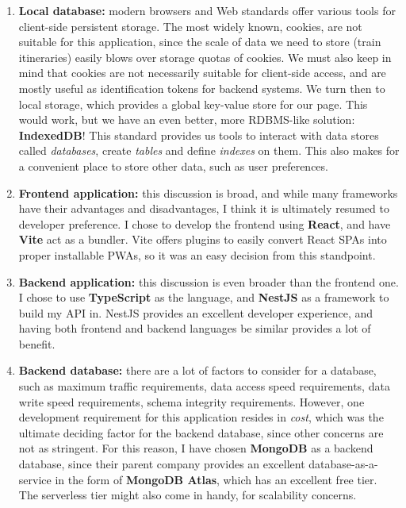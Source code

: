 \begin{enumerate}
    \item \textbf{Local database:} modern browsers and Web standards offer various tools for client-side persistent storage. The most widely known, cookies, are not suitable for this application, since the scale of data we need to store (train itinera\-ries) easily blows over storage quotas of cookies. We must also keep in mind that cookies are not necessarily suitable for client-side access, and are mostly useful as identification tokens for backend systems. We turn then to local storage, which provides a global key-value store for our page. This would work, but we have an even better, more RDBMS-like solution: \textbf{IndexedDB}! This standard provides us tools to interact with data stores called \textit{databases}, create \textit{tables} and define \textit{indexes} on them. This also makes for a convenient place to store other data, such as user preferences.
    \item \textbf{Frontend application:} this discussion is broad, and while many frameworks have their advantages and disadvantages, I think it is ultimately resumed to developer preference. I chose to develop the frontend using \textbf{React}, and have \textbf{Vite} act as a bundler. Vite offers plugins to easily convert React SPAs into proper installable PWAs, so it was an easy decision from this standpoint.
    \item \textbf{Backend application:} this discussion is even broader than the frontend one. I chose to use \textbf{TypeScript} as the language, and \textbf{NestJS} as a framework to build my API in. NestJS provides an excellent developer experience, and having both frontend and backend languages be similar provides a lot of benefit.
    \item \textbf{Backend database:} there are a lot of factors to consider for a database, such as maximum traffic requirements, data access speed requirements, data write speed requirements, schema integrity requirements. However, one development requirement for this application resides in \textit{cost}, which was the ultimate deciding factor for the backend database, since other concerns are not as stringent. For this reason, I have chosen \textbf{MongoDB} as a backend database, since their parent company provides an excellent database-as-a-service in the form of \textbf{MongoDB Atlas}, which has an excellent free tier. The serverless tier might also come in handy, for scalability concerns.
\end{enumerate}

